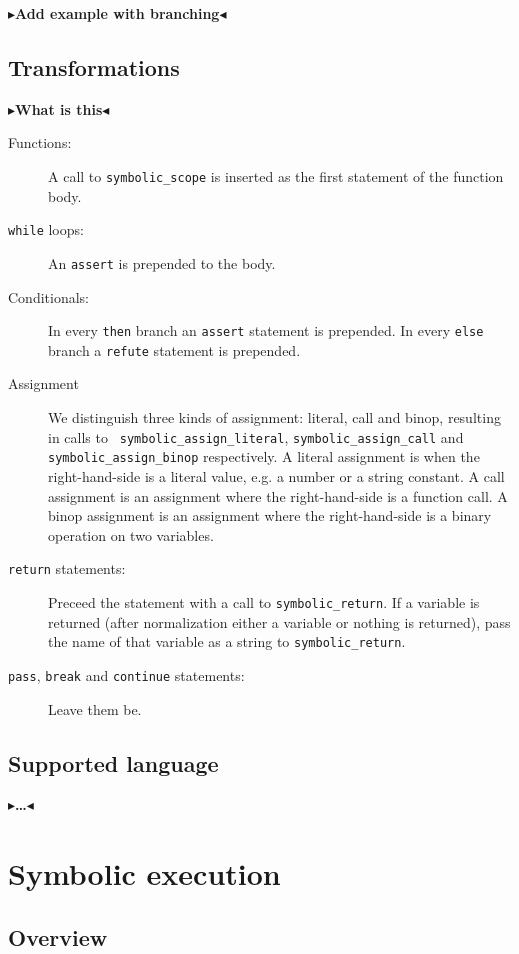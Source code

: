 \documentclass[11pt]{report}
\newcommand{\todo}[1]{{\color[rgb]{.5,0,0}\textbf{$\blacktriangleright$#1$\blacktriangleleft$}}}
\begin{document}
\todo{Add example with branching}

\section{Transformations}
\todo{What is this}

\begin{description}
  \item[Functions:] A call to {\tt symbolic\_scope} is inserted as the
    first statement of the function body.
  \item[{\tt while} loops:] An {\tt assert} is prepended to the body.
  \item[Conditionals:] In every {\tt then} branch an {\tt assert}
    statement is prepended. In every {\tt else} branch a {\tt refute}
    statement is prepended.
  \item[Assignment] We distinguish three kinds of assignment: literal,
    call and binop, resulting in calls to {\tt
      symbolic\_assign\_literal}, {\tt symbolic\_assign\_call} and
    {\tt symbolic\_assign\_binop} respectively. A literal assignment
    is when the right-hand-side is a literal value, e.g. a number or a
    string constant. A call assignment is an assignment where the
    right-hand-side is a function call. A binop assignment is an
    assignment where the right-hand-side is a binary operation on two
    variables.
  \item[{\tt return} statements:] Preceed the statement with a call to
    {\tt symbolic\_return}. If a variable is returned (after
    normalization either a variable or nothing is returned), pass the
    name of that variable as a string to {\tt symbolic\_return}.
  \item[{\tt pass}, {\tt break} and {\tt continue} statements:] Leave
    them be.
\end{description}

\section{Supported language}
\todo{\dots}

\chapter{Symbolic execution}
\label{ch:symbolic}

\section{Overview}
\end{document}
